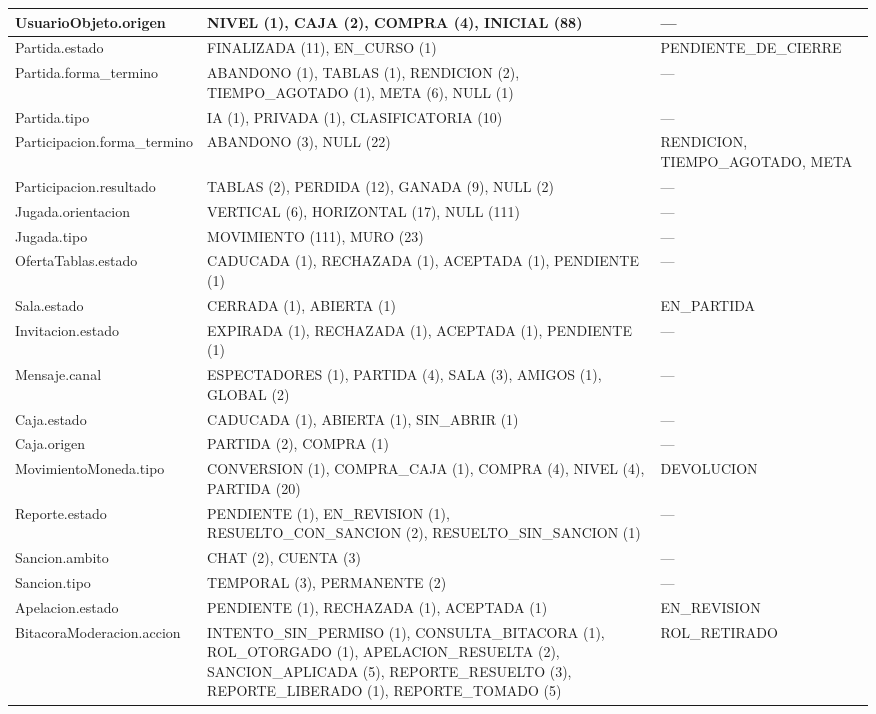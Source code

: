 \begin{center}
\begin{longtable}{|L{143.2pt}|L{159.3pt}|L{155.2pt}|}
UsuarioObjeto.origen & NIVEL (1), CAJA (2), COMPRA (4), INICIAL (88) & — \\ \hline
Partida.estado & FINALIZADA (11), EN\_\allowbreak{}CURSO (1) & PENDIENTE\_\allowbreak{}DE\_\allowbreak{}CIERRE \\ \hline
Partida.forma\_\allowbreak{}termino & ABANDONO (1), TABLAS (1), RENDICION (2), TIEMPO\_\allowbreak{}AGOTADO (1), META (6), NULL (1) & — \\ \hline
Partida.tipo & IA (1), PRIVADA (1), CLASIFICATORIA (10) & — \\ \hline
Participacion.forma\_\allowbreak{}termino & ABANDONO (3), NULL (22) & RENDICION, TIEMPO\_\allowbreak{}AGOTADO, META \\ \hline
Participacion.resultado & TABLAS (2), PERDIDA (12), GANADA (9), NULL (2) & — \\ \hline
Jugada.orientacion & VERTICAL (6), HORIZONTAL (17), NULL (111) & — \\ \hline
Jugada.tipo & MOVIMIENTO (111), MURO (23) & — \\ \hline
OfertaTablas.estado & CADUCADA (1), RECHAZADA (1), ACEPTADA (1), PENDIENTE (1) & — \\ \hline
Sala.estado & CERRADA (1), ABIERTA (1) & EN\_\allowbreak{}PARTIDA \\ \hline
Invitacion.estado & EXPIRADA (1), RECHAZADA (1), ACEPTADA (1), PENDIENTE (1) & — \\ \hline
Mensaje.canal & ESPECTADORES (1), PARTIDA (4), SALA (3), AMIGOS (1), GLOBAL (2) & — \\ \hline
Caja.estado & CADUCADA (1), ABIERTA (1), SIN\_\allowbreak{}ABRIR (1) & — \\ \hline
Caja.origen & PARTIDA (2), COMPRA (1) & — \\ \hline
MovimientoMoneda.tipo & CONVERSION (1), COMPRA\_\allowbreak{}CAJA (1), COMPRA (4), NIVEL (4), PARTIDA (20) & DEVOLUCION \\ \hline
Reporte.estado & PENDIENTE (1), EN\_\allowbreak{}REVISION (1), RESUELTO\_\allowbreak{}CON\_\allowbreak{}SANCION (2), RESUELTO\_\allowbreak{}SIN\_\allowbreak{}SANCION (1) & — \\ \hline
Sancion.ambito & CHAT (2), CUENTA (3) & — \\ \hline
Sancion.tipo & TEMPORAL (3), PERMANENTE (2) & — \\ \hline
Apelacion.estado & PENDIENTE (1), RECHAZADA (1), ACEPTADA (1) & EN\_\allowbreak{}REVISION \\ \hline
BitacoraModeracion.accion & INTENTO\_\allowbreak{}SIN\_\allowbreak{}PERMISO (1), CONSULTA\_\allowbreak{}BITACORA (1), ROL\_\allowbreak{}OTORGADO (1), APELACION\_\allowbreak{}RESUELTA (2), SANCION\_\allowbreak{}APLICADA (5), REPORTE\_\allowbreak{}RESUELTO (3), REPORTE\_\allowbreak{}LIBERADO (1), REPORTE\_\allowbreak{}TOMADO (5) & ROL\_\allowbreak{}RETIRADO \\ \hline

\end{longtable}
\end{center}
